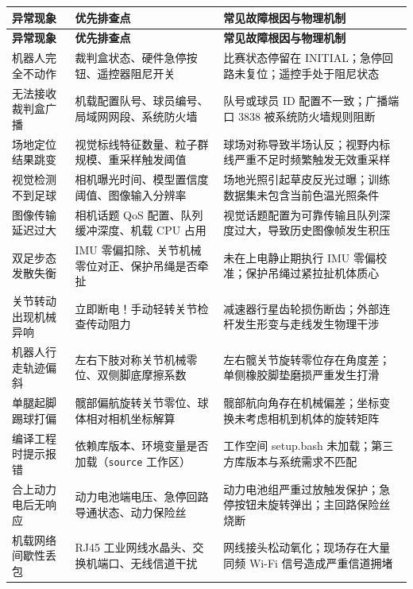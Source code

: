 \begin{longtable}{p{3.2cm} p{5.0cm} p{6.2cm}}
\toprule
\textbf{异常现象} & \textbf{优先排查点} & \textbf{常见故障根因与物理机制} \\
\midrule
\endfirsthead
\toprule
\textbf{异常现象} & \textbf{优先排查点} & \textbf{常见故障根因与物理机制} \\
\midrule
\endhead
\bottomrule
\endfoot
机器人完全不动作 & 裁判盒状态、硬件急停按钮、遥控器阻尼开关 & 比赛状态停留在 INITIAL；急停回路未复位；遥控手处于阻尼状态 \\
\addlinespace
无法接收裁判盒广播 & 机载配置队号、球员编号、局域网网段、系统防火墙 & 队号或球员 ID 配置不一致；广播端口 3838 被系统防火墙规则阻断 \\
\addlinespace
场地定位结果跳变 & 视觉标线特征数量、粒子群规模、重采样触发阈值 & 球场对称导致半场认反；视野内标线严重不足时频繁触发无效重采样 \\
\addlinespace
视觉检测不到足球 & 相机曝光时间、模型置信度阈值、图像输入分辨率 & 场地光照引起草皮反光过曝；训练数据集未包含当前色温光照条件 \\
\addlinespace
图像传输延迟过大 & 相机话题 QoS 配置、队列缓冲深度、机载 CPU 占用 & 视觉话题配置为可靠传输且队列深度过大，导致历史图像帧发生积压 \\
\addlinespace
双足步态发散失衡 & IMU 零偏扣除、关节机械零位对正、保护吊绳是否牵扯 & 未在上电静止期执行 IMU 零偏校准；保护吊绳过紧拉扯机体质心 \\
\addlinespace
关节转动出现机械异响 & 立即断电！手动轻转关节检查传动阻力 & 减速器行星齿轮损伤断齿；外部连杆发生形变与走线发生物理干涉 \\
\addlinespace
机器人行走轨迹偏斜 & 左右下肢对称关节机械零位、双侧脚底摩擦系数 & 左右髋关节旋转零位存在角度差；单侧橡胶脚垫磨损严重发生打滑 \\
\addlinespace
单腿起脚踢球打偏 & 髋部偏航旋转关节零位、球体相对相机坐标解算 & 髋部航向角存在机械偏差；坐标变换未考虑相机到机体的旋转矩阵 \\
\addlinespace
编译工程时提示报错 & 依赖库版本、环境变量是否加载（\texttt{source} 工作区） & 工作空间 setup.bash 未加载；第三方库版本与系统需求不匹配 \\
\addlinespace
合上动力电后无响应 & 动力电池端电压、急停回路导通状态、动力保险丝 & 动力电池组严重过放触发保护；急停按钮未旋转弹出；主回路保险丝烧断 \\
\addlinespace
机载网络间歇性丢包 & RJ45 工业网线水晶头、交换机端口、无线信道干扰 & 网线接头松动氧化；现场存在大量同频 Wi-Fi 信号造成严重信道拥堵 \\
\end{longtable}

